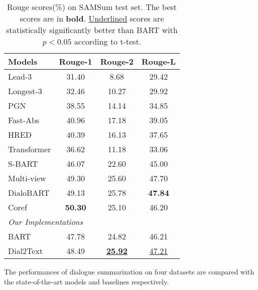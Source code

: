 \begin{table}
	\centering
	\small
	\begin{tabular}{lccc}
		\toprule[1pt]
		\textbf{Models} & \textbf{Rouge-1} & \textbf{Rouge-2} & \textbf{Rouge-L} \\
		\midrule[1pt]
		{Lead-3} &31.40&8.68&29.42\\
		{Longest-3} &32.46&10.27&29.92 \\
		{PGN} &38.55&14.14&34.85 \\
		{Fast-Abs} &40.96&17.18&39.05\\
		{HRED} &40.39&16.13&37.65\\
		{Transformer} &36.62&11.18&33.06 \\
		{S-BART} &46.07 &22.60 &45.00 \\
		{Multi-view} &49.30&25.60&47.70\\
		{DialoBART} &49.13 &25.78 &\textbf{47.84} \\
		{Coref} & \textbf{50.30} & 25.10 & 46.20 \\
		\midrule[1pt]
		\multicolumn{4}{l}{\textit{Our Implementations}} \\
		{BART} &47.78 &24.82 & 46.21\\
		{Dial2Text} & 48.49&\underline{\textbf{25.92}} &\underline{47.21} \\
		\bottomrule[1pt]
	\end{tabular}
	\caption{Rouge scores(\%) on SAMSum test set. The best scores are in \textbf{bold}. \underline{Underlined} scores are statistically significantly better than BART with $p<0.05$ according to t-test.}
	\label{tab:samsumresults}
\end{table}


The performances of dialogue summarization on four datasets are compared with the state-of-the-art models and baselines respectively.

